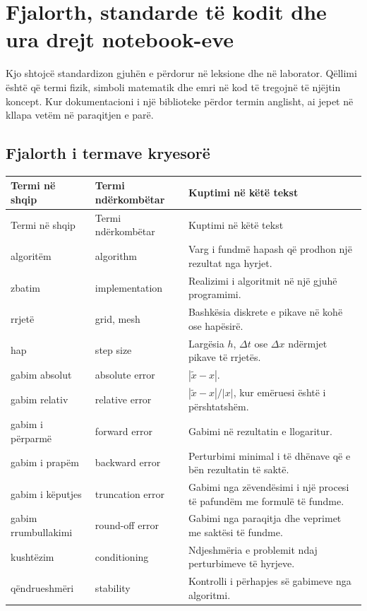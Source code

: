 \chapter{Fjalorth, standarde të kodit dhe ura drejt notebook-eve}
Kjo shtojcë standardizon gjuhën e përdorur në leksione dhe në laborator. Qëllimi është që termi fizik, simboli matematik dhe emri në kod të tregojnë të njëjtin koncept. Kur dokumentacioni i një biblioteke përdor termin anglisht, ai jepet në kllapa vetëm në paraqitjen e parë.

\section{Fjalorth i termave kryesorë}
\small
\begin{longtable}{p{}p{}p{}}
\toprule
Termi në shqip & Termi ndërkombëtar & Kuptimi në këtë tekst\\ \midrule
\endfirsthead
\toprule
Termi në shqip & Termi ndërkombëtar & Kuptimi në këtë tekst\\ \midrule
\endhead
algoritëm & algorithm & Varg i fundmë hapash që prodhon një rezultat nga hyrjet.\\
zbatim & implementation & Realizimi i algoritmit në një gjuhë programimi.\\
rrjetë & grid, mesh & Bashkësia diskrete e pikave në kohë ose hapësirë.\\
hap & step size & Largësia $h$, $\Delta t$ ose $\Delta x$ ndërmjet pikave të rrjetës.\\
gabim absolut & absolute error & $|\tilde x-x|$.\\
gabim relativ & relative error & $|\tilde x-x|/|x|$, kur emëruesi është i përshtatshëm.\\
gabim i përparmë & forward error & Gabimi në rezultatin e llogaritur.\\
gabim i prapëm & backward error & Perturbimi minimal i të dhënave që e bën rezultatin të saktë.\\
gabim i këputjes & truncation error & Gabimi nga zëvendësimi i një procesi të pafundëm me formulë të fundme.\\
gabim rrumbullakimi & round-off error & Gabimi nga paraqitja dhe veprimet me saktësi të fundme.\\
kushtëzim & conditioning & Ndjeshmëria e problemit ndaj perturbimeve të hyrjeve.\\
qëndrueshmëri & stability & Kontrolli i përhapjes së gabimeve nga algoritmi.\\

\end{longtable}
